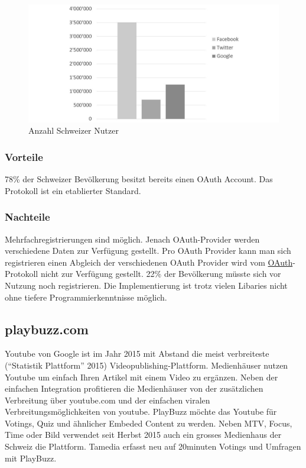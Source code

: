 \begin{figure}[htbp]
\centering
\includegraphics{images/excel-statistik/socialmedia-schweiz.jpg}
\caption[Anzahl Schweizer Nutzer]{Anzahl Schweizer
Nutzer\footnotemark{}}
\end{figure}

\newpage

\subsubsection{Vorteile}\label{vorteile}

78\% der Schweizer Bevölkerung besitzt bereits einen OAuth Account. Das
Protokoll ist ein etablierter Standard.

\subsubsection{Nachteile}\label{nachteile}

Mehrfachregistrierungen sind möglich. Jenach OAuth-Provider werden
verschiedene Daten zur Verfügung gestellt. Pro OAuth Provider kann man
sich registrieren einen Abgleich der verschiedenen OAuth Provider wird
vom \protect\hyperlink{oauth}{OAuth}-Protokoll nicht zur Verfügung
gestellt. 22\% der Bevölkerung müsste sich vor Nutzung noch
registrieren. Die Implementierung ist trotz vielen Libaries nicht ohne
tiefere Programmierkenntnisse möglich.

\newpage

\subsection{playbuzz.com}\label{playbuzz.com}

Youtube von Google ist im Jahr 2015 mit Abstand die meist verbreiteste
(``Statistik Plattform'' 2015) Videopublishing-Plattform. Medienhäuser
nutzen Youtube um einfach Ihren Artikel mit einem Video zu ergänzen.
Neben der einfachen Integration profitieren die Medienhäuser von der
zusätzlichen Verbreitung über youtube.com und der einfachen viralen
Verbreitungsmöglichkeiten von youtube. PlayBuzz möchte das Youtube für
Votings, Quiz und ähnlicher Embeded Content zu werden. Neben MTV, Focus,
Time oder Bild verwendet seit Herbst 2015 auch ein grosses Medienhaus
der Schweiz die Plattform. Tamedia erfasst neu auf 20minuten Votings und
Umfragen mit PlayBuzz.

